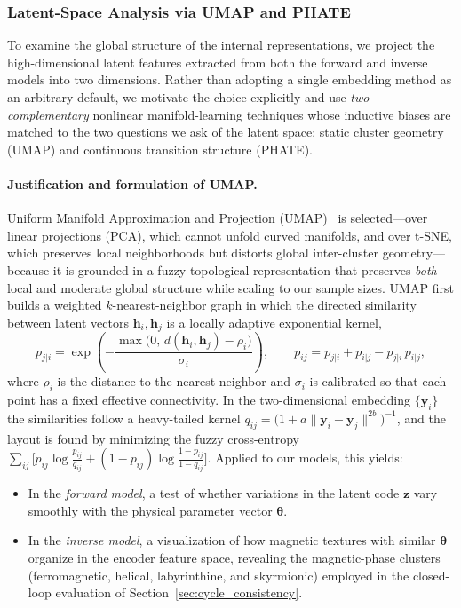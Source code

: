 \documentclass[letterpaper, 12, one column]{article}
\begin{document}
\subsubsection{Latent-Space Analysis via UMAP and PHATE}\label{sec:umap}

{\color[rgb]{0,0,1}To examine the global structure of the internal representations, we project the high-dimensional latent features extracted from both the forward and inverse models into two dimensions. Rather than adopting a single embedding method as an arbitrary default, we motivate the choice explicitly and use \emph{two complementary} nonlinear manifold-learning techniques whose inductive biases are matched to the two questions we ask of the latent space: static cluster geometry (UMAP) and continuous transition structure (PHATE).

\paragraph{Justification and formulation of UMAP.}
Uniform Manifold Approximation and Projection (UMAP)~\cite{ghojogh2021uniform} is selected---over linear projections (PCA), which cannot unfold curved manifolds, and over t-SNE, which preserves local neighborhoods but distorts global inter-cluster geometry---because it is grounded in a fuzzy-topological representation that preserves \emph{both} local and moderate global structure while scaling to our sample sizes. UMAP first builds a weighted $k$-nearest-neighbor graph in which the directed similarity between latent vectors $\mathbf{h}_i,\mathbf{h}_j$ is a locally adaptive exponential kernel,
\begin{equation}\label{eq:umap_highdim}
p_{j|i}=\exp\!\left(-\frac{\max\big(0,\,d(\mathbf{h}_i,\mathbf{h}_j)-\rho_i\big)}{\sigma_i}\right),\qquad
p_{ij}=p_{j|i}+p_{i|j}-p_{j|i}\,p_{i|j},
\end{equation}
where $\rho_i$ is the distance to the nearest neighbor and $\sigma_i$ is calibrated so that each point has a fixed effective connectivity. In the two-dimensional embedding $\{\mathbf{y}_i\}$ the similarities follow a heavy-tailed kernel $q_{ij}=\big(1+a\lVert\mathbf{y}_i-\mathbf{y}_j\rVert^{2b}\big)^{-1}$, and the layout is found by minimizing the fuzzy cross-entropy $\sum_{ij}\big[p_{ij}\log\tfrac{p_{ij}}{q_{ij}}+(1-p_{ij})\log\tfrac{1-p_{ij}}{1-q_{ij}}\big]$. Applied to our models, this yields:
\begin{itemize}
    \item[--] In the \emph{forward model}, a test of whether variations in the latent code $\mathbf{z}$ vary smoothly with the physical parameter vector $\boldsymbol{\theta}$.
    \item[--] In the \emph{inverse model}, a visualization of how magnetic textures with similar $\boldsymbol{\theta}$ organize in the encoder feature space, revealing the magnetic-phase clusters (ferromagnetic, helical, labyrinthine, and skyrmionic) employed in the closed-loop evaluation of Section~\ref{sec:cycle_consistency}.
\end{itemize}

}
\end{document}
